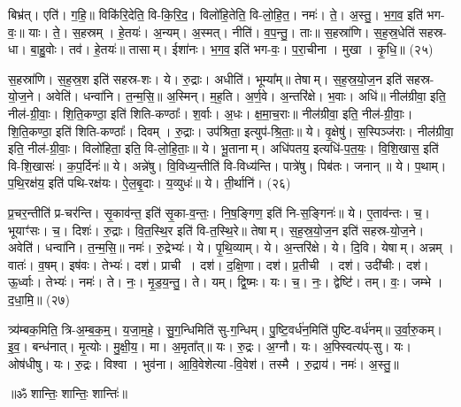 बिभ्र॑त्। एति॑। ग॒हि॒॥ 
विकि॑रि॒देति॒ वि-कि॒रि॒द॒। विलो॑हि॒तेति॒ वि-लो॒हि॒त॒। नमः॑। ते॒। अ॒स्तु॒। भ॒ग॒व॒ इति॑ भग-वः॒॥ 
याः। ते॒। स॒हस्रम्। हे॒तयः॑। अ॒न्यम्। अ॒स्मत्। नीति॑। व॒प॒न्तु॒। ताः॥ 
स॒हस्रा॑णि। स॒ह॒स्र॒धेति॑ सहस्र-धा। बा॒हु॒वोः। तव॑। हे॒तयः॑॥ 
तासाम्। ईशा॑नः। भ॒ग॒व॒ इति॑ भग-वः॒। प॒रा॒चीना। मुखा। कृ॒धि॒॥ (२५)


स॒हस्रा॑णि। स॒ह॒स्र॒श इति॑ सहस्र-शः। ये। रु॒द्राः। अधीति॑। भूम्या᳚म्॥ 
तेषाम्। स॒ह॒स्र॒यो॒ज॒न इति॑ सहस्र-यो॒ज॒ने। अवेति॑। धन्वा॑नि। त॒न्म॒सि॒॥ 
अ॒स्मिन्। म॒ह॒ति। अ॒र्ण॒वे। अ॒न्तरि॑क्षे। भ॒वाः। अधि॑॥ 
नील॑ग्रीवा॒ इति॒ नील॑-ग्री॒वाः॒। शि॒ति॒कण्ठा॒ इति॑ शिति-कण्ठाः᳚। श॒र्वाः। अ॒धः। क्ष॒मा॒च॒राः॥ 
नील॑ग्रीवा॒ इति॒ नील॑-ग्री॒वाः॒। शि॒ति॒कण्ठा॒ इति॑ शिति-कण्ठाः᳚। दिवम्। रु॒द्राः। उप॑श्रिता॒ इत्युप॑-श्रि॒ताः॒॥ 
ये। वृ॒क्षेषु॑। स॒स्पिञ्ज॑राः। नील॑ग्रीवा॒ इति॒ नील॑-ग्री॒वाः॒। विलो॑हिता॒ इति॒ वि-लो॒हि॒ताः॒॥ 
ये। भू॒तानाम्। अधि॑पतय॒ इत्यधि॑-प॒त॒यः॒। वि॒शि॒खास॒ इति॑ वि-शि॒खासः॑। क॒प॒र्दिनः॑॥ 
ये। अन्ने॑षु। वि॒विध्य॒न्तीति॑ वि-विध्य॑न्ति। पात्रे॑षु। पिब॑तः। जनान्॥ 
ये। प॒थाम्। प॒थि॒रक्ष॑य॒ इति॑ पथि-रक्ष॑यः। ऐ॒ल॒बृ॒दाः। य॒व्युधः॑॥ 
ये। ती॒र्थानि॑। (२६)


प्र॒चर॒न्तीति॑ प्र-चर॑न्ति। सृ॒काव॑न्त॒ इति॑ सृ॒का-व॒न्तः॒। नि॒ष॒ङ्गिण॒ इति॑ नि-स॒ङ्गिनः॑॥ 
ये। ए॒ताव॑न्तः। च॒। भूयाꣳ॑सः। च॒। दिशः॑। रु॒द्राः। वि॒त॒स्थि॒र इति॑ वि-त॒स्थि॒रे॥ 
तेषाम्। स॒ह॒स्र॒यो॒ज॒न इति॑ सहस्र-यो॒ज॒ने। अवेति॑। धन्वा॑नि। त॒न्म॒सि॒॥ 
नमः॑। रु॒द्रेभ्यः॑। ये। पृ॒थि॒व्याम्। ये। अ॒न्तरि॑क्षे। ये। दि॒वि। येषाम्। अन्नम्। वातः॑। व॒\ar{}षम्।
 इष॑वः। तेभ्यः॑। दश॑। प्राची। दश॑। द॒क्षि॒णा। दश॑। प्र॒तीची। दश॑। उदी॑चीः। दश॑। ऊ॒र्ध्वाः।
  तेभ्यः॑। नमः॑। ते। नः॒। मृ॒ड॒य॒न्तु॒। ते। यम्। द्वि॒ष्मः। यः। च॒। नः॒। द्वेष्टि॑। तम्। वः॒। जम्भे। द॒धा॒मि॒॥ (२७)

त्र्य॑म्बक॒मिति॒ त्रि-अ॒म्ब॒क॒म्॒। य॒जा॒म॒हे॒। सु॒ग॒न्धिमिति॑ सु-ग॒न्धिम्। पु॒ष्टि॒वर्ध॑न॒मिति॑ पुष्टि-वर्ध॑नम्॥ 
उ॒र्वा॒रु॒कम्। इ॒व॒। बन्ध॑नात्। मृ॒त्योः। मु॒क्षी॒य॒। मा। अ॒मृता᳚त्॥ 
यः। रु॒द्रः। अ॒ग्नौ। यः। अ॒फ्स्वित्य॑प्-सु। यः। ओष॑धीषु। यः। रु॒द्रः। विश्वा। भुव॑ना। आ॒वि॒वेशेत्या-वि॒वेश॑। तस्मै। रु॒द्राय॑। नमः॑। अ॒स्तु॒॥

\centerline{॥ॐ शान्तिः॒ शान्तिः॒ शान्तिः॑॥}



